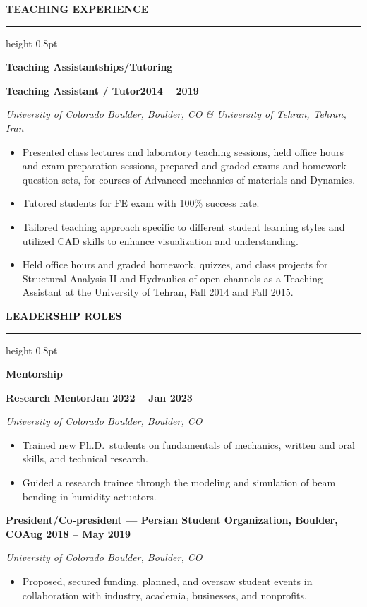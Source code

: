\documentclass[10pt, letterpaper]{article}
\newcommand{\rsection}[1]{%
  \vspace{8pt}%
  {\large\bfseries\MakeUppercase{#1}}%
  \vspace{1pt}%
  \hrule height 0.8pt%
  \vspace{4pt}%
}
\newcommand{\jobline}[2]{%
  \vspace{5pt}%
  \noindent\textbf{#1}\hfill\textbf{#2}\par%
  \vspace{1pt}%
}
\newcommand{\subline}[1]{%
  \vspace{-1pt}%
  \noindent\textit{#1}\par%
  \vspace{1pt}%
}
\newenvironment{rlist}{%
  \begin{itemize}[leftmargin=1.4em, itemsep=1pt, topsep=2pt, parsep=0pt]%
}{%
  \end{itemize}%
}
\begin{document}
\rsection{Teaching Experience}

\noindent\textbf{Teaching Assistantships/Tutoring}

\jobline{Teaching Assistant / Tutor}{2014 -- 2019}
\subline{University of Colorado Boulder, Boulder, CO \& University of Tehran, Tehran, Iran}
\begin{rlist}
  \item Presented class lectures and laboratory teaching sessions, held office hours and exam preparation sessions, prepared and graded exams and homework question sets, for courses of Advanced mechanics of materials and Dynamics.
  \item Tutored students for FE exam with 100\% success rate.
  \item Tailored teaching approach specific to different student learning styles and utilized CAD skills to enhance visualization and understanding.
  \item Held office hours and graded homework, quizzes, and class projects for Structural Analysis II and Hydraulics of open channels as a Teaching Assistant at the University of Tehran, Fall 2014 and Fall 2015.
\end{rlist}

\rsection{Leadership Roles}

\noindent\textbf{Mentorship}

\jobline{Research Mentor}{Jan 2022 -- Jan 2023}
\subline{University of Colorado Boulder, Boulder, CO}
\begin{rlist}
  \item Trained new Ph.D.\ students on fundamentals of mechanics, written and oral skills, and technical research.
  \item Guided a research trainee through the modeling and simulation of beam bending in humidity actuators.
\end{rlist}

\jobline{President/Co-president --- Persian Student Organization, Boulder, CO}{Aug 2018 -- May 2019}
\subline{University of Colorado Boulder, Boulder, CO}
\begin{rlist}
  \item Proposed, secured funding, planned, and oversaw student events in collaboration with industry, academia, businesses, and nonprofits.
\end{rlist}
\end{document}
